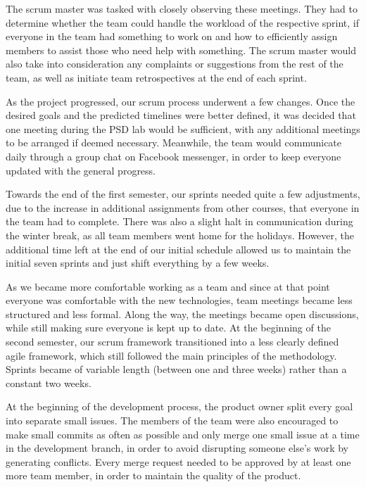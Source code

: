 \documentclass{l3proj}
\begin{document}
 The scrum master was tasked with closely observing these meetings. They had to determine whether the team could handle the workload of the respective sprint, if everyone in the team had something to work on and how to efficiently assign members to assist those who need help with something. The scrum master would also take into consideration any complaints or suggestions from the rest of the team, as well as initiate team retrospectives at the end of each sprint.
 
 As the project progressed, our scrum process underwent a few changes. Once the desired goals and the predicted timelines were better defined, it was decided that one meeting during the PSD lab would be sufficient, with any additional meetings to be arranged if deemed necessary. Meanwhile, the team would communicate daily through a group chat on Facebook messenger, in order to keep everyone updated with the general progress.
 
 Towards the end of the first semester, our sprints needed quite a few adjustments, due to the increase in additional assignments from other courses, that everyone in the team had to complete. There was also a slight halt in communication during the winter break, as all team members went home for the holidays. However, the additional time left at the end of our initial schedule allowed us to maintain the initial seven sprints and just shift everything by a few weeks.
 
 As we became more comfortable working as a team and since at that point everyone was comfortable with the new technologies, team meetings became less structured and less formal. Along the way, the meetings became open discussions, while still making sure everyone is kept up to date. At the beginning of the second semester, our scrum framework transitioned into a less clearly defined agile framework, which still followed the main principles of the methodology. Sprints became of variable length (between one and three weeks) rather than a constant two weeks.
 
 
 
 At the beginning of the development process, the product owner split every goal into separate small issues. The members of the team were also encouraged to make small commits as often as possible and only merge one small issue at a time in the development branch, in order to avoid disrupting someone else's work by generating conflicts. Every merge request needed to be approved by at least one more team member, in order to maintain the quality of the product.
 
\end{document}
